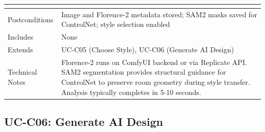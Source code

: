 \begin{table}[h]
\begin{tabular}{p{3cm}p{11cm}}
\begin{itemize}[leftmargin=*,noitemsep,topsep=0pt]
\end{itemize} \\
\midrule
Postconditions & Image and Florence-2 metadata stored; SAM2 masks saved for ControlNet; style selection enabled \\
\midrule
Includes & None \\
\midrule
Extends & UC-C05 (Choose Style), UC-C06 (Generate AI Design) \\
\midrule
Technical Notes & 
Florence-2 runs on ComfyUI backend or via Replicate API. SAM2 segmentation provides structural guidance for ControlNet to preserve room geometry during style transfer. Analysis typically completes in 5-10 seconds. \\
\bottomrule
\end{tabular}
\end{table}

\clearpage

\subsection{UC-C06: Generate AI Design}
\label{sec:uc_generate_design}


